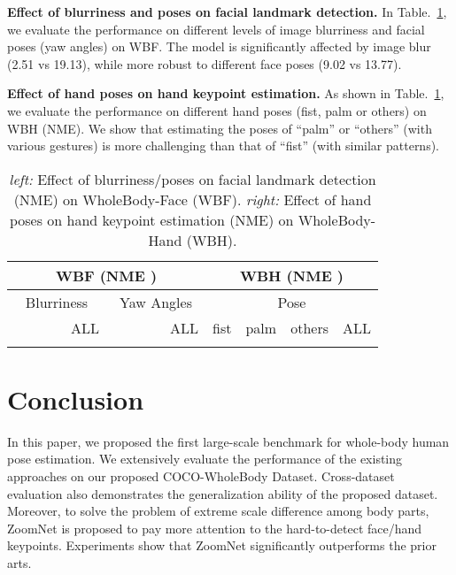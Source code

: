 \documentclass[runningheads]{llncs}
\begin{document}
	
	\textbf{Effect of blurriness and poses on facial landmark detection.} In Table.~\ref{tab:face_hand}, we evaluate the performance on different levels of image blurriness and facial poses (yaw angles) on WBF. The model is significantly affected by image blur (2.51 vs 19.13), while more robust to different face poses (9.02 vs 13.77).
	
	\textbf{Effect of hand poses on hand keypoint estimation.} As shown in Table.~\ref{tab:face_hand}, we evaluate the performance on different hand poses (fist, palm or others) on WBH (NME). We show that estimating the poses of ``palm'' or ``others'' (with various gestures) is more challenging than that of ``fist'' (with similar patterns). 
	
	\begin{table}[t]
		\def\arraystretch{1.2}
		\caption{\emph{left:} Effect of blurriness/poses on facial landmark detection (NME) on WholeBody-Face (WBF). \emph{right:} Effect of hand poses on hand keypoint estimation (NME) on WholeBody-Hand (WBH).}
		\scriptsize
		\begin{center}
			\begin{tabular}{c|c|c|c|c|c|c|c|c|c|c|c|c|c}
				\hline
				\multicolumn{10}{c|}{WBF (NME )} &\multicolumn{4}{c}{WBH (NME )} \\
				\hline
				\multicolumn{5}{c|}{Blurriness}  & \multicolumn{5}{c|}{Yaw Angles}  & \multicolumn{4}{|c}{Pose} \\ 
				\cline{1-14}
				 &  &  &  & ALL &  &  &  &  & ALL &  fist  & palm & others & ALL\\ 
				\hline
				 &  &  &  &  &  &  &  &  &   &    &  &  &  \\
				\hline
			\end{tabular}
		\end{center}
		\label{tab:face_hand}
	\end{table}
	
	\section{Conclusion}
	\label{sec:conclusion}
	In this paper, we proposed the first large-scale benchmark for whole-body human pose estimation. We extensively evaluate the performance of the existing approaches on our proposed COCO-WholeBody Dataset. Cross-dataset evaluation also demonstrates the generalization ability of the proposed dataset. Moreover, to solve the problem of extreme scale difference among body parts, ZoomNet is proposed to pay more attention to the hard-to-detect face/hand keypoints. Experiments show that ZoomNet significantly outperforms the prior arts. 
	
\end{document}
